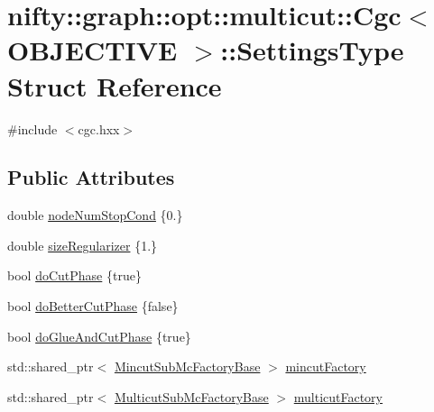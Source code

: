 \hypertarget{structnifty_1_1graph_1_1opt_1_1multicut_1_1Cgc_1_1SettingsType}{}\section{nifty\+:\+:graph\+:\+:opt\+:\+:multicut\+:\+:Cgc$<$ O\+B\+J\+E\+C\+T\+I\+VE $>$\+:\+:Settings\+Type Struct Reference}
\label{structnifty_1_1graph_1_1opt_1_1multicut_1_1Cgc_1_1SettingsType}


{\ttfamily \#include $<$cgc.\+hxx$>$}

\subsection*{Public Attributes}
\begin{DoxyCompactItemize}
\item 
double \hyperlink{structnifty_1_1graph_1_1opt_1_1multicut_1_1Cgc_1_1SettingsType_a3a2cb9e279f9e8751ba69401c4c950c1}{node\+Num\+Stop\+Cond} \{0.\}
\item 
double \hyperlink{structnifty_1_1graph_1_1opt_1_1multicut_1_1Cgc_1_1SettingsType_abede975214a1956344874632e9213416}{size\+Regularizer} \{1.\}
\item 
bool \hyperlink{structnifty_1_1graph_1_1opt_1_1multicut_1_1Cgc_1_1SettingsType_a39dbc828216c84964165d55a12ec5118}{do\+Cut\+Phase} \{true\}
\item 
bool \hyperlink{structnifty_1_1graph_1_1opt_1_1multicut_1_1Cgc_1_1SettingsType_a340e1399822d24afbaf5da7f5320bb8f}{do\+Better\+Cut\+Phase} \{false\}
\item 
bool \hyperlink{structnifty_1_1graph_1_1opt_1_1multicut_1_1Cgc_1_1SettingsType_a0883e7e35a7e5acc895b0b245539e566}{do\+Glue\+And\+Cut\+Phase} \{true\}
\item 
std\+::shared\+\_\+ptr$<$ \hyperlink{classnifty_1_1graph_1_1opt_1_1multicut_1_1Cgc_ae8877e2556e794a6c14da9cf805d0f5f}{Mincut\+Sub\+Mc\+Factory\+Base} $>$ \hyperlink{structnifty_1_1graph_1_1opt_1_1multicut_1_1Cgc_1_1SettingsType_a57a8c66be7f738117c692d3b694fcaeb}{mincut\+Factory}
\item 
std\+::shared\+\_\+ptr$<$ \hyperlink{classnifty_1_1graph_1_1opt_1_1multicut_1_1Cgc_ac0d77f789b221087aac1d2bb4f1cd2da}{Multicut\+Sub\+Mc\+Factory\+Base} $>$ \hyperlink{structnifty_1_1graph_1_1opt_1_1multicut_1_1Cgc_1_1SettingsType_ad35ea451937b57aa7269f4949751e02d}{multicut\+Factory}
\end{DoxyCompactItemize}


